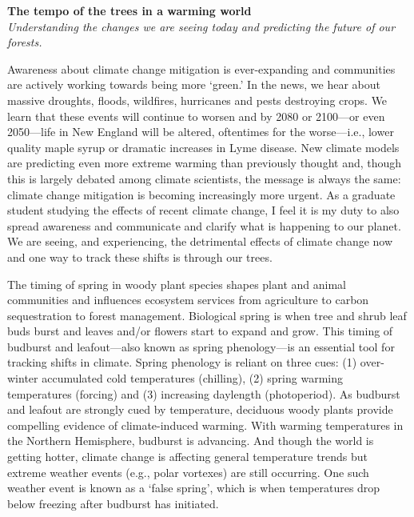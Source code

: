 \documentclass{article}\usepackage[]{graphicx}\usepackage[]{color}
\begin{document}
\noindent 
\textbf{\LARGE{The tempo of the trees in a warming world}}\\
\textit{\large{Understanding the changes we are seeing today and predicting the future of our forests.}}

Awareness about climate change mitigation is ever-expanding and communities are actively working towards being more `green.' In the news, we hear about massive droughts, floods, wildfires, hurricanes and pests destroying crops. We learn that these events will continue to worsen and by 2080 or 2100---or even 2050---life in New England will be altered, oftentimes for the worse---i.e., lower quality maple syrup or dramatic increases in Lyme disease. New climate models are predicting even more extreme warming than previously thought and, though this is largely debated among climate scientists, the message is always the same: climate change mitigation is becoming increasingly more urgent. As a graduate student studying the effects of recent climate change, I feel it is my duty to also spread awareness and communicate and clarify what is happening to our planet. We are seeing, and experiencing, the detrimental effects of climate change now and one way to track these shifts is through our trees. 

The timing of spring in woody plant species shapes plant and animal communities and influences ecosystem services from agriculture to carbon sequestration to forest management. Biological spring is when tree and shrub leaf buds burst and leaves and/or flowers start to expand and grow. This timing of budburst and leafout---also known as spring phenology---is an essential tool for tracking shifts in climate. Spring phenology is reliant on three cues: (1) over-winter accumulated cold temperatures (chilling), (2) spring warming temperatures (forcing) and (3) increasing daylength (photoperiod). As budburst and leafout are strongly cued by temperature, deciduous woody plants provide compelling evidence of climate-induced warming. With warming temperatures in the Northern Hemisphere, budburst is advancing. And though the world is getting hotter, climate change is affecting general temperature trends but extreme weather events (e.g., polar vortexes) are still occurring. One such weather event is known as a `false spring', which is when temperatures drop below freezing after budburst has initiated.
\end{document}
